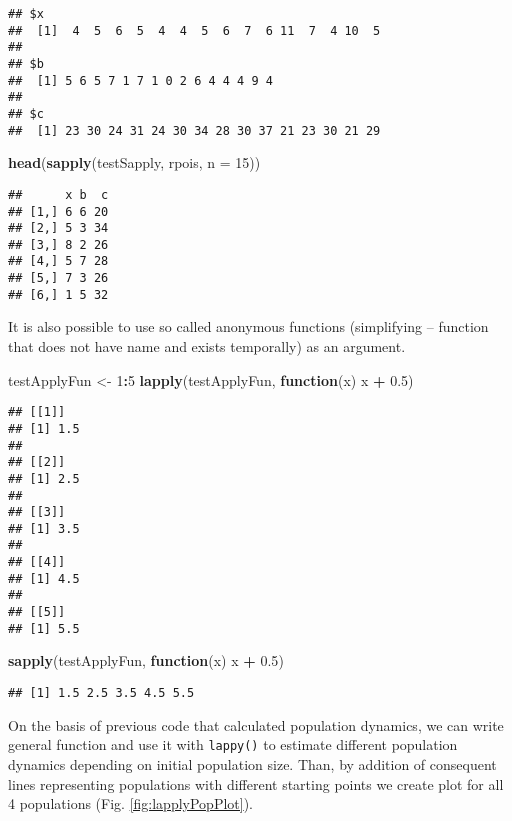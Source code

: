 \documentclass[]{book}
\newenvironment{Shaded}{\begin{snugshade}}{\end{snugshade}}
\newcommand{\KeywordTok}[1]{\textcolor[rgb]{0.13,0.29,0.53}{\textbf{#1}}}
\newcommand{\DataTypeTok}[1]{\textcolor[rgb]{0.13,0.29,0.53}{#1}}
\newcommand{\DecValTok}[1]{\textcolor[rgb]{0.00,0.00,0.81}{#1}}
\newcommand{\FloatTok}[1]{\textcolor[rgb]{0.00,0.00,0.81}{#1}}
\newcommand{\StringTok}[1]{\textcolor[rgb]{0.31,0.60,0.02}{#1}}
\newcommand{\ControlFlowTok}[1]{\textcolor[rgb]{0.13,0.29,0.53}{\textbf{#1}}}
\newcommand{\OperatorTok}[1]{\textcolor[rgb]{0.81,0.36,0.00}{\textbf{#1}}}
\newcommand{\NormalTok}[1]{#1}
\theoremstyle{definition}
\theoremstyle{definition}
\theoremstyle{definition}
\theoremstyle{remark}
\begin{document}
\begin{verbatim}
## $x
##  [1]  4  5  6  5  4  4  5  6  7  6 11  7  4 10  5
## 
## $b
##  [1] 5 6 5 7 1 7 1 0 2 6 4 4 4 9 4
## 
## $c
##  [1] 23 30 24 31 24 30 34 28 30 37 21 23 30 21 29
\end{verbatim}

\begin{Shaded}
\begin{Highlighting}[]
\KeywordTok{head}\NormalTok{(}\KeywordTok{sapply}\NormalTok{(testSapply, rpois, }\DataTypeTok{n =} \DecValTok{15}\NormalTok{))}
\end{Highlighting}
\end{Shaded}

\begin{verbatim}
##      x b  c
## [1,] 6 6 20
## [2,] 5 3 34
## [3,] 8 2 26
## [4,] 5 7 28
## [5,] 7 3 26
## [6,] 1 5 32
\end{verbatim}

It is also possible to use so called anonymous functions (simplifying --
function that does not have name and exists temporally) as an argument.

\begin{Shaded}
\begin{Highlighting}[]
\NormalTok{testApplyFun <-}\StringTok{ }\DecValTok{1}\OperatorTok{:}\DecValTok{5}
\KeywordTok{lapply}\NormalTok{(testApplyFun, }\ControlFlowTok{function}\NormalTok{(x) x }\OperatorTok{+}\StringTok{ }\FloatTok{0.5}\NormalTok{)}
\end{Highlighting}
\end{Shaded}

\begin{verbatim}
## [[1]]
## [1] 1.5
## 
## [[2]]
## [1] 2.5
## 
## [[3]]
## [1] 3.5
## 
## [[4]]
## [1] 4.5
## 
## [[5]]
## [1] 5.5
\end{verbatim}

\begin{Shaded}
\begin{Highlighting}[]
\KeywordTok{sapply}\NormalTok{(testApplyFun, }\ControlFlowTok{function}\NormalTok{(x) x }\OperatorTok{+}\StringTok{ }\FloatTok{0.5}\NormalTok{)}
\end{Highlighting}
\end{Shaded}

\begin{verbatim}
## [1] 1.5 2.5 3.5 4.5 5.5
\end{verbatim}

On the basis of previous code that calculated population dynamics, we
can write general function and use it with \texttt{lappy()} to estimate
different population dynamics depending on initial population size.
Than, by addition of consequent lines representing populations with
different starting points we create plot for all 4 populations (Fig.
\ref{fig:lapplyPopPlot}).
\end{document}

